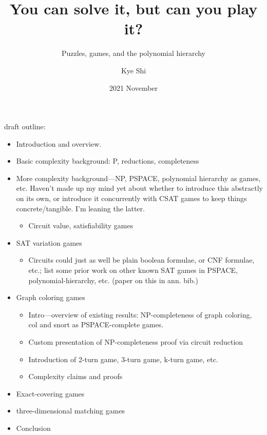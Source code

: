 \documentclass{final-report}
\title{You can solve it, but can you play it?}
\subtitle{Puzzles, games, and the polynomial hierarchy}
\author{Kye Shi}
\date{2021 November}
\begin{document}
\frontmatter
\maketitle
\tableofcontents

draft outline:

\begin{itemize}
  \item Introduction and overview.
  \item Basic complexity background: P, reductions, completeness
  \item More complexity background---NP, PSPACE, polynomial hierarchy as games,
    etc. Haven't made up my mind yet about whether to introduce this abstractly
    on its own, or introduce it concurrently with CSAT games to keep things
    concrete/tangible.  I'm leaning the latter.
    \begin{itemize}
      \item Circuit value, satisfiability games
    \end{itemize}
  \item SAT variation games
    \begin{itemize}
      \item Circuits could just as well be plain boolean formulae, or CNF
        formulae, etc.; list some prior work on other known SAT games in
        PSPACE, polynomial-hierarchy, etc.  (paper on this in ann. bib.)
    \end{itemize}
  \item Graph coloring games
    \begin{itemize}
      \item Intro---overview of existing results: NP-completeness of graph
        coloring, col and snort as PSPACE-complete games.
      \item Custom presentation of NP-completeness proof via circuit reduction
      \item Introduction of 2-turn game, 3-turn game, k-turn game, etc.
      \item Complexity claims and proofs
    \end{itemize}
  \item Exact-covering games
  \item three-dimensional matching games
  \item Conclusion %
\end{itemize}


\mainmatter






%
%
%
%

\printbibliography[heading=bibnumbered]
\end{document}
